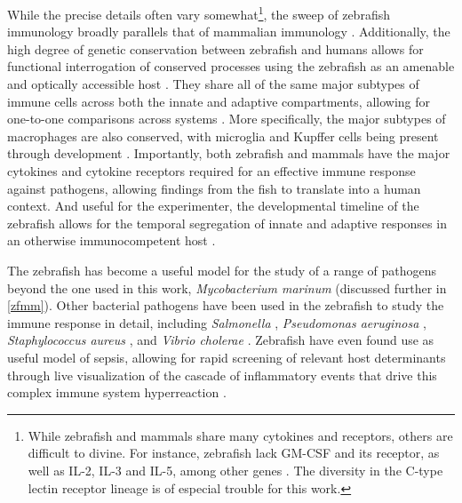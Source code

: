 While the precise details often vary somewhat\footnote{While zebrafish and mammals share many cytokines and receptors, others are difficult to divine. For instance, zebrafish lack GM\hyp{}CSF and its receptor, as well as IL\hyp{}2, IL\hyp{}3 and IL\hyp{}5, among other genes \citep{Pazhakh2018, Lawir2019, Stachura2013}. The diversity in the C\hyp{}type lectin receptor lineage is of especial trouble for this work.}, the sweep of zebrafish immunology broadly parallels that of mammalian immunology \citep{Zou2016, Renshaw2012}. Additionally, the high degree of genetic conservation between zebrafish and humans allows for functional interrogation of conserved processes using the zebrafish as an amenable and optically accessible host \citep{Gomes2020}. They share all of the same major subtypes of immune cells across both the innate and adaptive compartments, allowing for one\hyp{}to\hyp{}one comparisons across systems \citep{vanderSar2004, Thisse2002}. More specifically, the major subtypes of macrophages are also conserved, with microglia and Kupffer cells being present through development \citep{Oosterhof2015, Shwartz2019}. Importantly, both zebrafish and mammals have the major cytokines and cytokine receptors required for an effective immune response against pathogens, allowing findings from the fish to translate into a human context. And useful for the experimenter, the developmental timeline of the zebrafish allows for the temporal segregation of innate and adaptive responses in an otherwise immunocompetent host \citep{Sullivan2017, Masud2017}.

The zebrafish has become a useful model for the study of a range of pathogens beyond the one used in this work, \textit{Mycobacterium marinum} \citep{Benard2012, Brannon2009, Briolat2014} (discussed further in \autoref{zfmm}). Other bacterial pathogens have been used in the zebrafish to study the immune response in detail, including \textit{Salmonella} \citep{vanderSar2003}, \textit{Pseudomonas aeruginosa} \citep{Pont2021}, \textit{Staphylococcus aureus} \citep{Prajsnar2008}, and \textit{Vibrio cholerae} \citep{Runft2014}. Zebrafish have even found use as useful model of sepsis, allowing for rapid screening of relevant host determinants through live visualization of the cascade of inflammatory events that drive this complex immune system hyperreaction \citep{Barber2016, Philip2017, Ruyra2014}.

